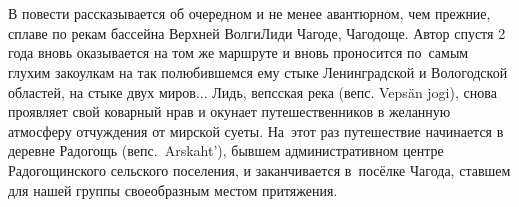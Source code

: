 \chapter*{}

В повести рассказывается об очередном и не менее авантюрном, чем прежние, сплаве по рекам бассейна Верхней Волги\mdash Лиди Чагоде, Чагодоще. Автор спустя 2 года вновь оказывается на том же маршруте и вновь проносится по~самым глухим закоулкам на так полюбившемся ему стыке Ленинградской и Вологодской областей, на стыке двух миров$\ldots$ Лидь, вепсская река (вепс. Veps{\"a}n jogi), снова проявляет свой коварный нрав и окунает путешественников в желанную атмосферу отчуждения от мирской суеты. На~этот раз путешествие начинается в деревне Радогощь (вепс.~Arskaht'), бывшем административном центре Радогощинского сельского поселения, и заканчивается в~посёлке Чагода, ставшем для нашей группы своеобразным местом притяжения. 
%
